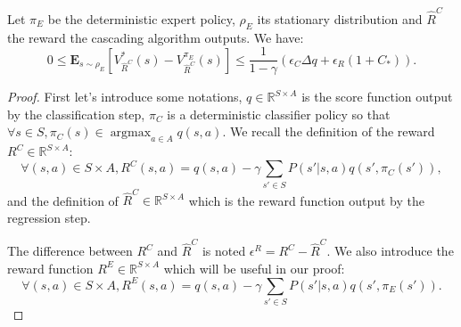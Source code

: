 \documentclass[smallextended]{svjour3}
\newcommand{\E}{\mathbf{E}}
\newcommand{\argmax}{\operatorname*{argmax}} %
\begin{document}
\begin{theorem}
\label{thm}
Let $\pi_E$ be the deterministic expert policy, $\rho_E$ its stationary distribution and $\hat{R}^C$ the reward the cascading algorithm outputs. We have:
\begin{equation}
0\leq\E_{s\sim\rho_E}[V^*_{\hat{R}^C}(s)-V^{\pi_E}_{\hat{R}^C}(s)]\leq \frac{1}{1-\gamma}\left(\epsilon_C\Delta q +\epsilon_R(1+C_*)\right).
\end{equation}
\end{theorem}
\begin{proof}
First let's introduce some notations, $q\in\mathbb{R}^{S\times A}$ is the score function output by the classification step, $\pi_C$ is a deterministic classifier policy so that $\forall s \in S,\pi_C(s)\in\argmax_{a\in A}q(s,a)$. We recall the definition of the reward $R^C\in\mathbb{R}^{S\times A}$:
\begin{equation}
\forall (s,a)\in S\times A, R^C(s,a)=q(s,a) -\gamma\sum_{s'\in S}P(s'|s,a)q(s',\pi_C(s')),
\end{equation}
and the definition of $\hat{R}^C\in\mathbb{R}^{S\times A}$ which is the reward function output by the regression step.

The difference between $R^C$ and $\hat{R}^C$ is noted $\epsilon^R=R^C-\hat{R}^C$.
We also introduce the reward function $R^E\in\mathbb{R}^{S\times A}$ which will be useful in our proof:
\begin{equation}
\forall (s,a)\in S\times A, R^E(s,a)=q(s,a) -\gamma\sum_{s'\in S}P(s'|s,a)q(s',\pi_E(s')).
\end{equation}


\end{proof}
\end{document}
